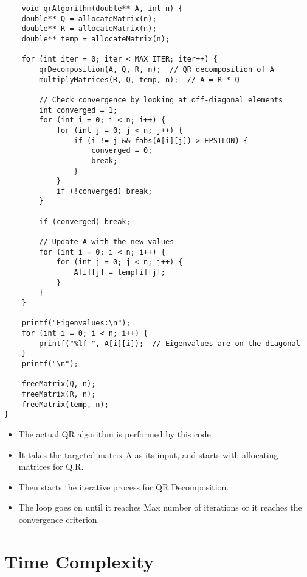 \documentclass{article}
\begin{document}
\begin{lstlisting}
    void qrAlgorithm(double** A, int n) {
    double** Q = allocateMatrix(n);
    double** R = allocateMatrix(n);
    double** temp = allocateMatrix(n);

    for (int iter = 0; iter < MAX_ITER; iter++) {
        qrDecomposition(A, Q, R, n);  // QR decomposition of A
        multiplyMatrices(R, Q, temp, n);  // A = R * Q
        
        // Check convergence by looking at off-diagonal elements
        int converged = 1;
        for (int i = 0; i < n; i++) {
            for (int j = 0; j < n; j++) {
                if (i != j && fabs(A[i][j]) > EPSILON) {
                    converged = 0;
                    break;
                }
            }
            if (!converged) break;
        }

        if (converged) break;

        // Update A with the new values
        for (int i = 0; i < n; i++) {
            for (int j = 0; j < n; j++) {
                A[i][j] = temp[i][j];
            }
        }
    }

    printf("Eigenvalues:\n");
    for (int i = 0; i < n; i++) {
        printf("%lf ", A[i][i]);  // Eigenvalues are on the diagonal
    }
    printf("\n");

    freeMatrix(Q, n);
    freeMatrix(R, n);
    freeMatrix(temp, n);
}
\end{lstlisting}
\begin{itemize}
\item The actual QR algorithm is performed by this code. 
\item It takes the targeted matrix A as its input, and starts with allocating matrices for Q,R.
\item Then starts the iterative process for QR Decomposition.
\item The loop goes on until it reaches Max number of iterations or it reaches the convergence criterion. 
\end{itemize}

\section{Time Complexity}
\end{document}
